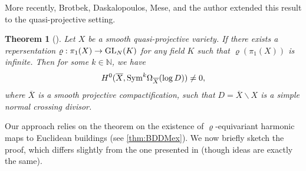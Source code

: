 \documentclass[english]{amsproc}
\theoremstyle{plain}
\newtheorem{thm}{Theorem}[section]
\theoremstyle{definition}
\theoremstyle{remark}
\theoremstyle{plain}
\numberwithin{equation}{thm} %
\newcommand{\bN}{\mathbb{N}}
\newcommand{\GL}{{\rm GL}}
\begin{document}
More recently, Brotbek, Daskalopoulos, Mese, and the author \cite{BDDM} extended this result to the quasi-projective setting. 
\begin{thm}[{\cite[Theorem B]{BDDM}}]\label{thm:sym}
	Let $X$ be a smooth quasi-projective variety. If there exists a repersentation $\varrho:\pi_1(X)\to\GL_{N}(K)$ for any field $K$ such that $\varrho(\pi_1(X))$ is infinite. Then  for some $k\in \bN$, 
	we have
	$$
	H^0(\overline{X}, {\rm Sym}^k\Omega_{\overline{X}}(\log D))\neq 0,
	$$
	where  $\overline{X}$ is a smooth projective compactification, such that $D=\overline{X}\backslash X$ is a simple normal crossing divisor. 
\end{thm}   
Our approach relies on the theorem on the existence of $\varrho$-equivariant harmonic maps to Euclidean buildings (see \cref{thm:BDDMex}). We now briefly sketch the proof, which differs slightly from the one presented in \cite{BDDM}   (though ideas are exactly the same).
\end{document}
